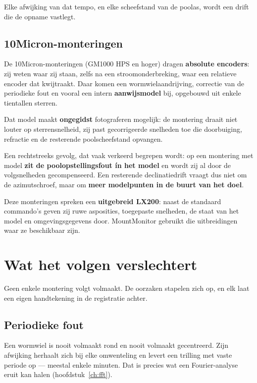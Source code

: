 Elke afwijking van dat tempo, en elke scheefstand van de poolas, wordt een
drift die de opname vastlegt.

\section{10Micron-monteringen}

De 10Micron-monteringen (GM1000 HPS en hoger) dragen \textbf{absolute
encoders}: zij weten waar zij staan, zelfs na een stroomonderbreking, waar een
relatieve encoder dat kwijtraakt. Daar komen een wormwielaandrijving, correctie
van de periodieke fout en vooral een intern \textbf{aanwijsmodel} bij, opgebouwd
uit enkele tientallen sterren.

Dat model maakt \textbf{ongegidst} fotograferen mogelijk: de montering draait
niet louter op sterrensnelheid, zij past gecorrigeerde snelheden toe die
doorbuiging, refractie en de resterende poolscheefstand opvangen.

\begin{warning}
Een rechtstreeks gevolg, dat vaak verkeerd begrepen wordt: op een montering met
model \textbf{zit de poolopstellingsfout ín het model} en wordt zij al door de
volgsnelheden gecompenseerd. Een resterende declinatiedrift vraagt dus niet om
de azimutschroef, maar om \textbf{meer modelpunten in de buurt van het doel}.
\end{warning}

Deze monteringen spreken een \textbf{uitgebreid LX200}: naast de standaard
commando's geven zij ruwe asposities, toegepaste snelheden, de staat van het
model en omgevingsgegevens door. MountMonitor gebruikt die uitbreidingen waar
ze beschikbaar zijn.

\chapter{Wat het volgen verslechtert}
\label{ch:errors}

Geen enkele montering volgt volmaakt. De oorzaken stapelen zich op, en elk
laat een eigen handtekening in de registratie achter.

\section{Periodieke fout}

Een wormwiel is nooit volmaakt rond en nooit volmaakt gecentreerd. Zijn afwijking
herhaalt zich bij elke omwenteling en levert een trilling met vaste periode op
--- meestal enkele minuten. Dat is precies wat een Fourier-analyse eruit kan
halen (hoofdstuk~\ref{ch:fft}).

